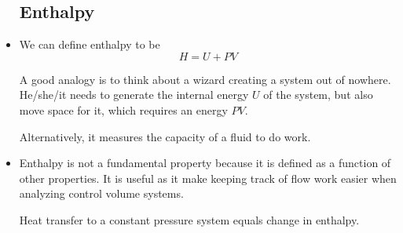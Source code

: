 \begin{itemize}
          \subsection{Enthalpy}
    \item We can define enthalpy to be
          \begin{equation}
              H = U + PV
          \end{equation}
          \begin{idea}
              A good analogy is to think about a wizard creating a system out of nowhere. He/she/it needs to generate the internal energy $U$ of the system, but also move space for it, which requires an energy $PV$.
              \vspace{2mm}

              Alternatively, it measures the capacity of a fluid to do work.
          \end{idea}
    \item Enthalpy is not a fundamental property because it is defined as a function of other properties. It is useful as it make keeping track of flow work easier when analyzing control volume systems.
          \begin{idea}
              Heat transfer to a constant pressure system equals change in enthalpy.
          \end{idea}

\end{itemize}
